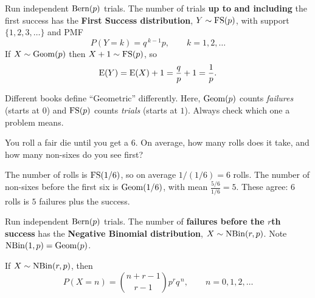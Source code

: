 \bigskip

\begin{story}\label{story:fs}
Run independent $\operatorname{Bern}(p)$ trials. The number of trials \textbf{up to and including} the first success has the \textbf{First Success distribution}, $Y \sim \operatorname{FS}(p)$, with support $\{1, 2, 3, \dots\}$ and PMF
\medskip
\[
P(Y = k) = q^{\,k-1} p, \qquad k = 1, 2, \dots
\]
\medskip
If $X \sim \operatorname{Geom}(p)$ then $X + 1 \sim \operatorname{FS}(p)$, so
\medskip
\[
\operatorname{E}(Y) = \operatorname{E}(X) + 1 = \frac{q}{p} + 1 = \frac{1}{p}.
\]
\end{story}

\bigskip

\begin{pitfall}
Different books define ``Geometric'' differently. Here, $\operatorname{Geom}(p)$ counts \emph{failures} (starts at $0$) and $\operatorname{FS}(p)$ counts \emph{trials} (starts at $1$). Always check which one a problem means.
\end{pitfall}

\bigskip

\begin{example}
You roll a fair die until you get a $6$. On average, how many rolls does it take, and how many non-sixes do you see first?
\end{example}

\medskip

\begin{solution}
The number of rolls is $\operatorname{FS}(1/6)$, so on average $1/(1/6) = 6$ rolls. The number of non-sixes before the first six is $\operatorname{Geom}(1/6)$, with mean $\frac{5/6}{1/6} = 5$. These agree: $6$ rolls is $5$ failures plus the success.
\end{solution}

\bigskip

\begin{story}\label{story:nbin}
Run independent $\operatorname{Bern}(p)$ trials. The number of \textbf{failures before the $r$th success} has the \textbf{Negative Binomial distribution}, $X \sim \operatorname{NBin}(r, p)$. Note $\operatorname{NBin}(1, p) = \operatorname{Geom}(p)$.
\end{story}

\bigskip

\begin{theorem}\label{thm:nbinpmf}
If $X \sim \operatorname{NBin}(r, p)$, then
\medskip
\[
P(X = n) = \binom{n + r - 1}{r - 1} p^{r} q^{\,n}, \qquad n = 0, 1, 2, \dots
\]
\end{theorem}

